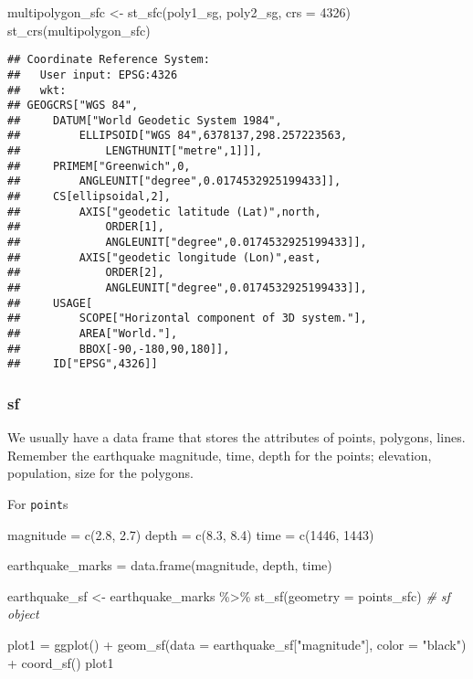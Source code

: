 \documentclass[
]{book}
\newenvironment{Shaded}{\begin{snugshade}}{\end{snugshade}}
\newcommand{\AttributeTok}[1]{\textcolor[rgb]{0.77,0.63,0.00}{#1}}
\newcommand{\CommentTok}[1]{\textcolor[rgb]{0.56,0.35,0.01}{\textit{#1}}}
\newcommand{\DecValTok}[1]{\textcolor[rgb]{0.00,0.00,0.81}{#1}}
\newcommand{\FloatTok}[1]{\textcolor[rgb]{0.00,0.00,0.81}{#1}}
\newcommand{\FunctionTok}[1]{\textcolor[rgb]{0.00,0.00,0.00}{#1}}
\newcommand{\NormalTok}[1]{#1}
\newcommand{\OtherTok}[1]{\textcolor[rgb]{0.56,0.35,0.01}{#1}}
\newcommand{\SpecialCharTok}[1]{\textcolor[rgb]{0.00,0.00,0.00}{#1}}
\newcommand{\StringTok}[1]{\textcolor[rgb]{0.31,0.60,0.02}{#1}}
\begin{document}
\begin{Shaded}
\begin{Highlighting}[]
\NormalTok{multipolygon\_sfc }\OtherTok{\textless{}{-}} \FunctionTok{st\_sfc}\NormalTok{(poly1\_sg, poly2\_sg, }\AttributeTok{crs =} \DecValTok{4326}\NormalTok{)}
\FunctionTok{st\_crs}\NormalTok{(multipolygon\_sfc)}
\end{Highlighting}
\end{Shaded}

\begin{verbatim}
## Coordinate Reference System:
##   User input: EPSG:4326 
##   wkt:
## GEOGCRS["WGS 84",
##     DATUM["World Geodetic System 1984",
##         ELLIPSOID["WGS 84",6378137,298.257223563,
##             LENGTHUNIT["metre",1]]],
##     PRIMEM["Greenwich",0,
##         ANGLEUNIT["degree",0.0174532925199433]],
##     CS[ellipsoidal,2],
##         AXIS["geodetic latitude (Lat)",north,
##             ORDER[1],
##             ANGLEUNIT["degree",0.0174532925199433]],
##         AXIS["geodetic longitude (Lon)",east,
##             ORDER[2],
##             ANGLEUNIT["degree",0.0174532925199433]],
##     USAGE[
##         SCOPE["Horizontal component of 3D system."],
##         AREA["World."],
##         BBOX[-90,-180,90,180]],
##     ID["EPSG",4326]]
\end{verbatim}

\hypertarget{sf}{%
\subsubsection{sf}\label{sf}}

We usually have a data frame that stores the attributes of points, polygons, lines. Remember the earthquake magnitude, time, depth for the points; elevation, population, size for the polygons.

For \texttt{point}s

\begin{Shaded}
\begin{Highlighting}[]
\NormalTok{magnitude }\OtherTok{=} \FunctionTok{c}\NormalTok{(}\FloatTok{2.8}\NormalTok{, }\FloatTok{2.7}\NormalTok{)}
\NormalTok{depth }\OtherTok{=} \FunctionTok{c}\NormalTok{(}\FloatTok{8.3}\NormalTok{, }\FloatTok{8.4}\NormalTok{)}
\NormalTok{time }\OtherTok{=} \FunctionTok{c}\NormalTok{(}\DecValTok{1446}\NormalTok{, }\DecValTok{1443}\NormalTok{)}

\NormalTok{earthquake\_marks }\OtherTok{=} \FunctionTok{data.frame}\NormalTok{(magnitude, depth, time)}

\NormalTok{earthquake\_sf }\OtherTok{\textless{}{-}}\NormalTok{ earthquake\_marks }\SpecialCharTok{\%\textgreater{}\%} \FunctionTok{st\_sf}\NormalTok{(}\AttributeTok{geometry =}\NormalTok{ points\_sfc)    }\CommentTok{\# sf object}

\NormalTok{plot1 }\OtherTok{=} \FunctionTok{ggplot}\NormalTok{() }\SpecialCharTok{+} 
  \FunctionTok{geom\_sf}\NormalTok{(}\AttributeTok{data =}\NormalTok{ earthquake\_sf[}\StringTok{"magnitude"}\NormalTok{], }\AttributeTok{color =} \StringTok{"black"}\NormalTok{) }\SpecialCharTok{+}
  \FunctionTok{coord\_sf}\NormalTok{() }
\NormalTok{plot1}
\end{Highlighting}
\end{Shaded}
\end{document}
